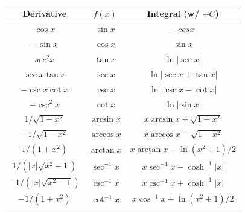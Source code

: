\begin{center} \begin{tabular}{|c|c|c|} \hline
Derivative                  & $f(x)$        & Integral (w/ $+C$)               \\ \hline
$\cos x$                    & $\sin x$      & $-cos x$                         \\ \hline
$-\sin x$                   & $\cos x$      & $\sin x$                         \\ \hline
$sec^2 x$                   & $\tan x$      & $\ln |\sec x|$                   \\ \hline
$\sec x \tan x$             & $\sec x$      & $\ln|\sec x + \tan x|$           \\ \hline
$-\csc x \cot x$            & $\csc x$      & $\ln|\csc x - \cot x|$           \\ \hline
$-\csc^2 x$                 & $\cot x$      & $\ln |\sin x|$                   \\ \hline
$1 / \sqrt{1 - x^2}$        & $\arcsin x$   & $x \arcsin x + \sqrt{1 - x^2}$   \\ \hline
$-1 / \sqrt{1 - x^2}$       & $\arccos x$   & $x \arccos x - \sqrt{1 - x^2}$   \\ \hline
$1 / (1 + x^2)$             & $\arctan x$   & $x \arctan x - \ln(x^2 + 1)/2$   \\ \hline
$1 / (|x| \sqrt{x^2 - 1})$  & $\sec^{-1} x$ & $x \sec^{-1} x - \cosh^{-1} |x|$ \\ \hline
$-1 / (|x| \sqrt{x^2 - 1})$ & $\csc^{-1} x$ & $x \csc^{-1} x + \cosh^{-1} |x|$ \\ \hline
$-1 / (1 + x^2)$            & $\cot^{-1} x$ & $x \cos^{-1} x + \ln(x^2+1)/2$   \\ \hline
\end{tabular} \end{center}